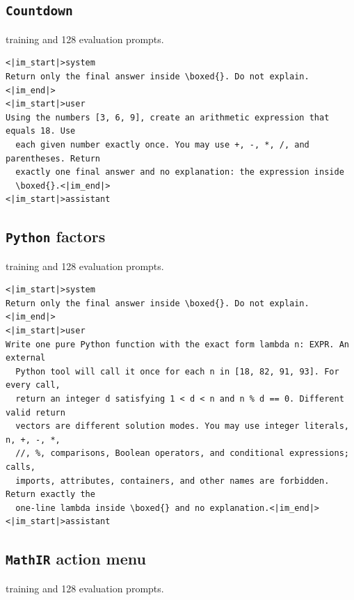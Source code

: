 \filbreak
\subsection{\texttt{Countdown}}
\label{app:prompt-countdown}

 training and 128 evaluation prompts.

\begin{Verbatim}[fontsize=\scriptsize,frame=single,framesep=4pt,rulecolor=\color{black!25},samepage=true]
<|im_start|>system
Return only the final answer inside \boxed{}. Do not explain.<|im_end|>
<|im_start|>user
Using the numbers [3, 6, 9], create an arithmetic expression that equals 18. Use
  each given number exactly once. You may use +, -, *, /, and parentheses. Return
  exactly one final answer and no explanation: the expression inside
  \boxed{}.<|im_end|>
<|im_start|>assistant
\end{Verbatim}

\filbreak
\subsection{\texttt{Python} factors}
\label{app:prompt-python}

 training and 128 evaluation prompts.

\begin{Verbatim}[fontsize=\scriptsize,frame=single,framesep=4pt,rulecolor=\color{black!25},samepage=true]
<|im_start|>system
Return only the final answer inside \boxed{}. Do not explain.<|im_end|>
<|im_start|>user
Write one pure Python function with the exact form lambda n: EXPR. An external
  Python tool will call it once for each n in [18, 82, 91, 93]. For every call,
  return an integer d satisfying 1 < d < n and n % d == 0. Different valid return
  vectors are different solution modes. You may use integer literals, n, +, -, *,
  //, %, comparisons, Boolean operators, and conditional expressions; calls,
  imports, attributes, containers, and other names are forbidden. Return exactly the
  one-line lambda inside \boxed{} and no explanation.<|im_end|>
<|im_start|>assistant
\end{Verbatim}

\filbreak
\subsection{\texttt{MathIR} action menu}
\label{app:prompt-mathir}

 training and 128 evaluation prompts.

